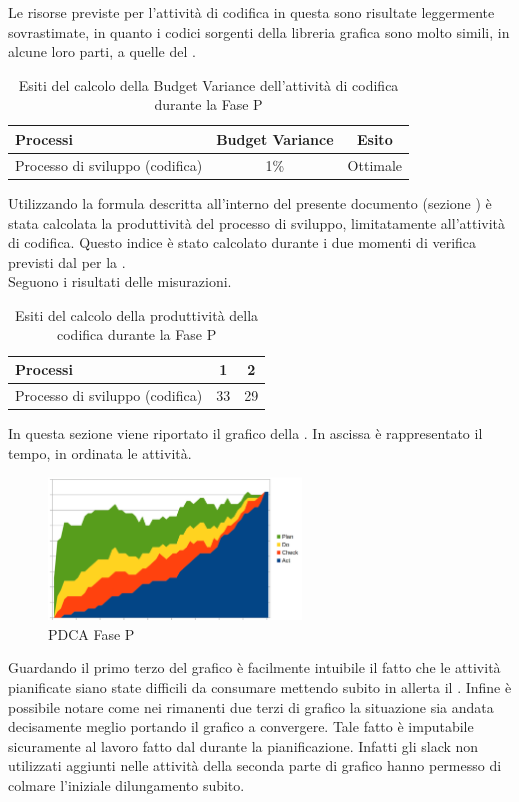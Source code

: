 Le risorse previste per l'attività di codifica in questa  sono risultate leggermente sovrastimate, in quanto i codici sorgenti della libreria grafica  sono molto simili, in alcune loro parti, a quelle del \textit{} .
			\begin{table}[H]
				\centering
				\begin{tabu}{| l | c | c |}
					\hline
						Processi 							& Budget Variance	& Esito		\\ \hline \hline
						Processo di sviluppo (codifica) & 1\% & Ottimale \\ \hline
				\end{tabu}
				\caption{Esiti del calcolo della Budget Variance dell'attività di codifica durante la Fase P}
			\end{table}	
Utilizzando la formula descritta all'interno del presente documento (sezione ) è stata calcolata la produttività del processo di sviluppo, limitatamente all'attività di codifica. Questo indice è stato calcolato durante i due momenti di verifica previsti dal  per la .\\
Seguono i risultati delle misurazioni.
\\\begin{table}[H]
				\centering
				\begin{tabu}{| l | c | c |}
					\hline
						Processi 							& 1	& 2		\\ \hline \hline
						Processo di sviluppo (codifica) & 33 & 29  \\ \hline
				\end{tabu}
				\caption{Esiti del calcolo della produttività della codifica durante la Fase P}
			\end{table}	

In questa sezione viene riportato il grafico  della . In ascissa è rappresentato il tempo, in ordinata le attività.
\begin{figure}[H]
	\centering
	\includegraphics[width=0.6\textwidth]{PianoDiQualifica/Pics/GraficoPDCAFaseP.png}
	\caption{PDCA Fase P}
\end{figure}
Guardando il primo terzo del grafico è facilmente intuibile il fatto che le attività pianificate siano state difficili da consumare mettendo subito in allerta il . Infine è possibile notare come nei rimanenti due terzi di grafico la situazione sia andata decisamente meglio portando il grafico a convergere. Tale fatto è imputabile sicuramente al lavoro fatto dal  durante la pianificazione. Infatti gli slack non utilizzati aggiunti nelle attività della seconda parte di grafico hanno permesso di colmare l'iniziale dilungamento subito.